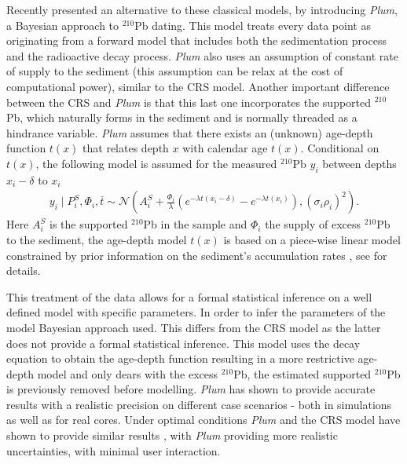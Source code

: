 \documentclass [10pt] {article}
\begin{document}
Recently \citet{Aquino2018} presented an alternative to these classical models, by introducing \textit{Plum}, a Bayesian approach to $^{210}$Pb dating.
This model treats every data point as originating from a forward model that includes both the sedimentation process and the radioactive decay process.
\textit{Plum} also uses an assumption of constant rate of supply to the sediment (this assumption can be relax at the cost of computational power), similar to the CRS model. 
Another important difference between the CRS and \textit{Plum} is that this last one incorporates the supported $^{210}$Pb, which naturally forms in the sediment and is normally threaded as a hindrance variable.
\textit{Plum} assumes that there exists an (unknown) age-depth function $t(x)$ that relates depth $x$ with calendar age $t(x)$. 
Conditional on $t(x)$, the following model is assumed for the measured $^{210}$Pb $y_i$ between depths $x_i - \delta$ to $x_i$
\begin{eqnarray}
y_i\mid P^S_i, \Phi_i, \bar{t}\sim \mathcal{N} \left(A^S_i+\frac{\Phi_i}{\lambda} \left( e^{-\lambda t(x_i-\delta)} - e^{-\lambda t(x_i)} \right), (\sigma_i\rho_i)^2 \right). 
\end{eqnarray}
Here $A_i^S$ is the supported $^{210}$Pb in the sample and $\Phi_i$ the supply of excess $^{210}$Pb to the sediment, the age-depth model $t(x)$ is based on a piece-wise linear model constrained by prior information on the sediment's accumulation rates  \citep{Blaauw2011}, see \cite{Aquino2018} for details.%

This treatment of the data allows for a formal statistical inference on a well defined model with specific parameters. 
In order to infer the parameters of the model Bayesian approach used.
This differs from the CRS model as the latter does not provide a formal statistical inference.
This model uses the decay equation to obtain the age-depth function resulting in a more restrictive age-depth model and only dears with the excess $^{210}$Pb, the estimated supported $^{210}$Pb is previously removed before modelling.
\textit{Plum} has shown to provide accurate results with a realistic precision on different case scenarios \citep{Aquino2018,Aquino2020} - both in simulations as well as for real cores.
Under optimal conditions \textit{Plum} and the CRS model have shown to provide similar results \citep{Aquino2020}, with \textit{Plum} providing more realistic uncertainties, with minimal user interaction. 
\end{document}
